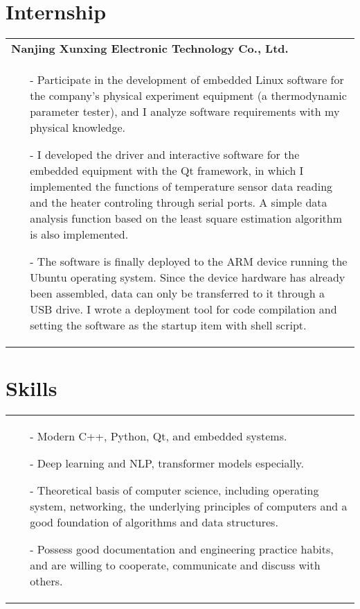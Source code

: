 \documentclass[a4paper,12pt]{article}
\newcommand{\signed}[1]{%
\unskip\nobreak\hfil\penalty50
   \hskip2em\hbox{}\nobreak\hfil#1
   \parfillskip=0pt \finalhyphendemerits=0 }
\begin{document}
\section{Internship}
\begin{tabularx}{\linewidth}{ @{}X@{} }
    \textbf{Nanjing Xunxing Electronic Technology Co., Ltd.}
    \signed{Jun. 2020 - Aug. 2020} \\[3.75pt]
    \begin{minipage}[t]{\linewidth}
        \begin{itemize}[nosep,after=\strut, leftmargin=1em, itemsep=3pt]
            \item[-] Participate in the development of embedded Linux software for the company's physical experiment equipment (a thermodynamic parameter tester), and I analyze software requirements with my physical knowledge.
            \item[-] I developed the driver and interactive software for the embedded equipment with the Qt framework, in which I implemented the functions of temperature sensor data reading and the heater controling through serial ports. A simple data analysis function based on the least square estimation algorithm is also implemented.
            \item[-] The software is finally deployed to the ARM device running the Ubuntu operating system. Since the device hardware has already been assembled, data can only be transferred to it through a USB drive. I wrote a deployment tool for code compilation and setting the software as the startup item with shell script.
        \end{itemize}
        \end{minipage}
\end{tabularx}
\section{Skills}
\begin{tabularx}{\linewidth}{@{}l}
\begin{minipage}[t]{\linewidth}
\begin{itemize}[nosep,after=\strut, leftmargin=1em, itemsep=3pt]
    \item[-] Modern C++, Python, Qt, and embedded systems.
    \item[-] Deep learning and NLP, transformer models especially.
    \item[-] Theoretical basis of computer science, including operating system, networking, the underlying principles of computers and a good foundation of algorithms and data structures.
    \item[-] Possess good documentation and engineering practice habits, and are willing to cooperate, communicate and discuss with others.
\end{itemize}
\end{minipage}
\end{tabularx}

\vfill
{}
\end{document}
